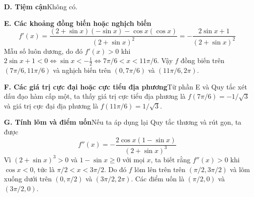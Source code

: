 \documentclass[10pt]{article}
\begin{document}
\begin{minipage}[t]{0.74\textwidth}
    \textbf{D. Tiệm cận}\quad Không có.

    \textbf{E. Các khoảng đồng biến hoặc nghịch biến}
    \[
        f'(x) = \frac{(2 + \sin x)(-\sin x) - \cos x(\cos x)}{(2 + \sin x)^2} = -\frac{2\sin x + 1}{(2 + \sin x)^2}
    \]
    Mẫu số luôn dương, do đó $f'(x) > 0$ khi $2\sin x + 1 < 0 \iff \sin x < -\frac{1}{2} \iff 7\pi/6 < x < 11\pi/6$. Vậy $f$ đồng biến trên $(7\pi/6, 11\pi/6)$ và nghịch biến trên $(0, 7\pi/6)$ và $(11\pi/6, 2\pi)$.

    \textbf{F. Các giá trị cực đại hoặc cực tiểu địa phương}\quad Từ phần E và Quy tắc xét dấu đạo hàm cấp một, ta thấy giá trị cực tiểu địa phương là $f(7\pi/6) = -1/\sqrt{3}$ và giá trị cực đại địa phương là $f(11\pi/6) = 1/\sqrt{3}$.

    \textbf{G. Tính lõm và điểm uốn}\quad Nếu ta áp dụng lại Quy tắc thương và rút gọn, ta được
    \[
        f''(x) = -\frac{2\cos x(1 - \sin x)}{(2 + \sin x)^3}
    \]
    Vì $(2 + \sin x)^3 > 0$ và $1 - \sin x \ge 0$ với mọi $x$, ta biết rằng $f''(x) > 0$ khi $\cos x < 0$, tức là $\pi/2 < x < 3\pi/2$. Do đó $f$ lõm lên trên trên $(\pi/2, 3\pi/2)$ và lõm xuống dưới trên $(0, \pi/2)$ và $(3\pi/2, 2\pi)$. Các điểm uốn là $(\pi/2, 0)$ và $(3\pi/2, 0)$.
\end{minipage}
\end{document}
